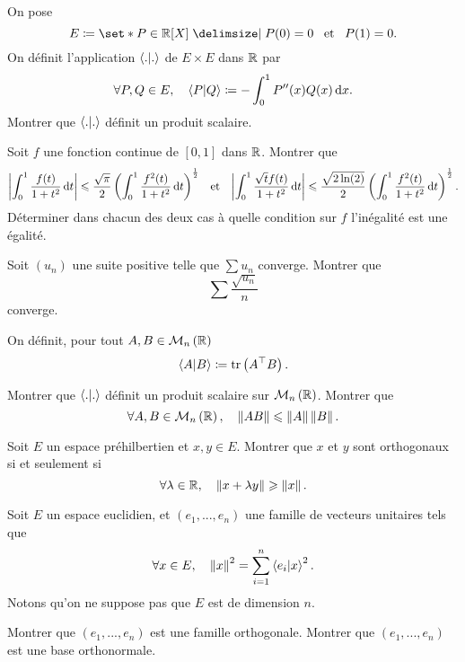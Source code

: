 \documentclass{magnolia}
\begin{document}


On pose
\[E\defeq\enstq{P\in\polyR}{P(0)=0 \et P(1)=0}.\]
On définit l'application $\left\langle {.}\middle|{.}\right\rangle$ de $E\times E$ dans $\mathbb{R}$ par
\[\forall P,Q\in E,\quad \left\langle {P}\middle|{Q}\right\rangle\coloneqq-\int_{0}^{1} P''(x)Q(x)\,\text{d}x.\]
Montrer que $\left\langle {.}\middle|{.}\right\rangle$ définit un produit scalaire.






Soit $f$ une fonction continue de $[0,1]$ dans $\mathbb{R}$. Montrer que
\[\left|\int_{0}^{1} \frac{f(t)}{1+t^2}\,\text{d}t\right|\leqslant\frac{\sqrt{\pi}}{2}
  \left(\int_{0}^{1} \frac{f^2(t)}{1+t^2}\,\text{d}t\right)^{\frac{1}{2}} \quad\!\text{et}\quad\! 
  \left|\int_{0}^{1} \frac{\sqrt{t}f(t)}{1+t^2}\,\text{d}t\right|\leqslant\frac{\sqrt{2 \ln(2)}}{2}
  \left(\int_{0}^{1} \frac{f^2(t)}{1+t^2}\,\text{d}t\right)^{\frac{1}{2}}.\]
Déterminer dans chacun des deux cas à quelle condition sur $f$ l'inégalité est une
égalité.

Soit $(u_n)$ une suite positive telle que $\sum u_n$ converge. Montrer que
\[\sum \frac{\sqrt{u_n}}{n}\]
converge.


On définit, pour tout $A,B\in\mathcal{M}_{n}\left(\mathbb{R}\right)$
\[\left\langle {A}\middle|{B}\right\rangle\coloneqq\operatorname{tr}\left({A}^{\top}B\right).\]
\begin{questions}
\question Montrer que $\left\langle {.}\middle|{.}\right\rangle$ définit un produit scalaire sur $\mathcal{M}_{n}\left(\mathbb{R}\right)$.
\question Montrer que
  \[\forall A,B\in\mathcal{M}_{n}\left(\mathbb{R}\right),\quad \left\|AB\right\|\leqslant\left\|A\right\|\left\|B\right\|.\]
\end{questions}


Soit $E$ un espace préhilbertien et $x,y\in E$. Montrer que $x$ et $y$ sont orthogonaux si
et seulement si
\[\forall \lambda\in\mathbb{R} ,\quad \left\|x+\lambda y\right\|\geqslant\left\|x\right\|.\]

Soit $E$ un espace euclidien, et $(e_{1},...,e_{n})$ une famille de vecteurs unitaires
tels que
\[\forall x\in E,\quad \left\|x\right\|^2=\sum_{i=1}^{n}\left\langle {e_i}\middle|{x}\right\rangle^{2}.\]
Notons qu'on ne suppose pas que $E$ est de dimension $n$.
\begin{questions}
\question Montrer que $(e_{1},...,e_{n})$ est une famille orthogonale.  
\question Montrer que $(e_{1},...,e_{n})$ est une base orthonormale.                                   
\end{questions}
\end{document}
